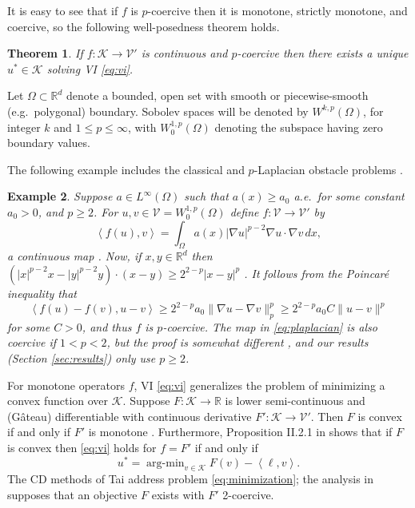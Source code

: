 \documentclass[letterpaper,final,12pt,reqno]{amsart}
\theoremstyle{cstyle}
\newtheorem{theorem}{Theorem}
\theoremstyle{cstyle*}
\theoremstyle{dstyle}
\newtheorem{example}[theorem]{Example}
\numberwithin{equation}{section}
\numberwithin{figure}{section}
\numberwithin{table}{section}
\numberwithin{theorem}{section}
\newcommand{\RR}{\mathbb{R}}
\newcommand{\grad}{\nabla}
\newcommand{\cK}{\mathcal{K}}
\newcommand{\cV}{\mathcal{V}}
\newcommand{\ip}[2]{\left<#1,#2\right>}
\begin{document}
It is easy to see that if $f$ is $p$-coercive then it is monotone, strictly monotone, and coercive, so the following well-posedness theorem holds.

\begin{theorem}  \label{thm:viwellposed}  If $f:\cK \to \cV'$ is continuous and $p$-coercive then there exists a unique $u^*\in \cK$ solving VI \eqref{eq:vi}.
\end{theorem}

Let $\Omega \subset \RR^d$ denote a bounded, open set with smooth or piecewise-smooth (e.g.~polygonal) boundary.  Sobolev spaces \cite{Evans2010} will be denoted by $W^{k,p}(\Omega)$, for integer $k$ and $1\le p \le \infty$, with $W^{1,p}_0(\Omega)$ denoting the subspace having zero boundary values.

The following example includes the classical and $p$-Laplacian obstacle problems \cite{ChoeLewis1991}.

\begin{example}  \label{ex:plaplacian}  Suppose $a\in L^\infty(\Omega)$ such that $a(x)\ge a_0$ a.e.~for some constant $a_0>0$, and $p\ge 2$.  For $u,v \in \cV = W^{1,p}_0(\Omega)$ define $f:\cV \to \cV'$ by
\begin{equation}
\ip{f(u)}{v} = \int_\Omega a(x) |\grad u|^{p-2} \grad u \cdot \grad v\,dx, \label{eq:plaplacian}
\end{equation}
a continuous map \cite[Theorem A.0.6]{Peral1997}.  Now, if $x,y\in\RR^d$ then $(|x|^{p-2} x - |y|^{p-2} y)\cdot (x-y) \ge 2^{2-p} |x-y|^p$ \cite[Appendix A]{Bueler2021conservation}.  It follows from the Poincar\'e inequality that
    $$\ip{f(u) - f(v)}{u-v} \ge 2^{2-p} a_0 \|\grad u - \grad v\|_p^p \ge 2^{2-p} a_0 C \|u-v\|^p$$
for some $C>0$, and thus $f$ is $p$-coercive.  The map in \eqref{eq:plaplacian} is also coercive if $1<p<2$, but the proof is somewhat different \cite[Theorem 4.4]{Bueler2021conservation}, and our results (Section \ref{sec:results}) only use $p\ge 2$.  \end{example}

For monotone operators $f$, VI \eqref{eq:vi} generalizes the problem of minimizing a convex function over $\cK$.  Suppose $F:\cK \to \RR$ is lower semi-continuous and (G\^ateau) differentiable with continuous derivative $F':\cK \to \cV'$.  Then $F$ is convex if and only if $F'$ is monotone \cite[Proposition I.5.5]{EkelandTemam1976}.  Furthermore, Proposition II.2.1 in \cite{EkelandTemam1976} shows that if $F$ is convex then \eqref{eq:vi} holds for $f=F'$ if and only if
\begin{equation}
u^* = \operatorname{arg-min}_{v\in\cK} F(v) - \ip{\ell}{v}. \label{eq:minimization}
\end{equation}
The CD methods of Tai \cite{Tai2003} address problem \eqref{eq:minimization}; the analysis in \cite{Tai2003} supposes that an objective $F$ exists with $F'$ 2-coercive.
\end{document}
